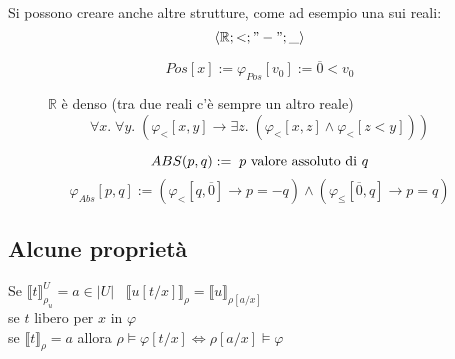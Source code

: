 \documentclass{article}
\theoremstyle{break}
\theoremstyle{break}
\theoremstyle{break}
\theoremstyle{break}
\begin{document}
  Si possono creare anche altre strutture, come ad esempio una sui reali:
  \[
    \left< \mathbb{R}; <; "-"; \_ \right>
  \] 

  \begin{figure}[H]
    \begin{exercise}[Positivo]
      \[
        Pos[x] := \varphi_{Pos}[v_0] := \overline{0} < v_0 
      \] 
    \end{exercise}
  \end{figure}

  \begin{figure}[H]
    \begin{exercise}[R è denso]
      \( \mathbb{R} \) è denso (tra due reali c'è sempre un altro reale)
      \[
        \forall x.\; \forall y.\;( \varphi_{<}[x,y] \to \exists z.\; (\varphi_{<}[x,z] \wedge \varphi_{<}[z < y]))
      \] 
    \end{exercise}
  \end{figure}


  \begin{figure}[H]
    \begin{exercise}
      \[
        ABS(p,q) := \; \text{\( p \) valore assoluto di \( q \)}
      \] 
      \[
        \varphi_{Abs}[p,q] := (\varphi_{<}[q,\overline{0}] \to p = -q) \wedge (\varphi_{\le}[\overline{0},q] \to p = q)
      \] 
    \end{exercise}
  \end{figure}

  \subsection{Alcune proprietà}
  Se \( \llbracket t\rrbracket_{\rho_u}^U = a \in |U| \;\;\; \llbracket u[t/x]\rrbracket_{\rho} = \llbracket u\rrbracket_{\rho[a/x]} \) \\
  se \( t \) libero per \( x \) in \( \varphi  \)\\
  se \( \llbracket t\rrbracket_{\rho } = a \) allora \( \rho \models \varphi[t/x] \Leftrightarrow \rho[a/x] \models \varphi  \) 
\end{document}
